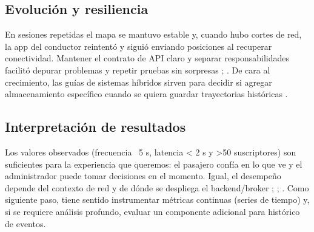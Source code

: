 \subsection{Evolución y resiliencia}
En sesiones repetidas el mapa se mantuvo estable y, cuando hubo cortes de red, la app del conductor reintentó y siguió enviando posiciones al recuperar conectividad. Mantener el contrato de API claro y separar responsabilidades facilitó depurar problemas y repetir pruebas sin sorpresas \cite{easyrest2022}; \cite{poo2023}. De cara al crecimiento, las guías de sistemas híbridos sirven para decidir si agregar almacenamiento específico cuando se quiera guardar trayectorias históricas \cite{ingenieria2022}.

\subsection{Interpretación de resultados}
Los valores observados (frecuencia ~5 s, latencia < 2 s y >50 suscriptores) son suficientes para la experiencia que queremos: el pasajero confía en lo que ve y el administrador puede tomar decisiones en el momento. Igual, el desempeño depende del contexto de red y de dónde se despliega el backend/broker \cite{cityruta2018new}; \cite{stopbus2016new}; \cite{ingenieria2022}. Como siguiente paso, tiene sentido instrumentar métricas continuas (series de tiempo) y, si se requiere análisis profundo, evaluar un componente adicional para histórico de eventos.